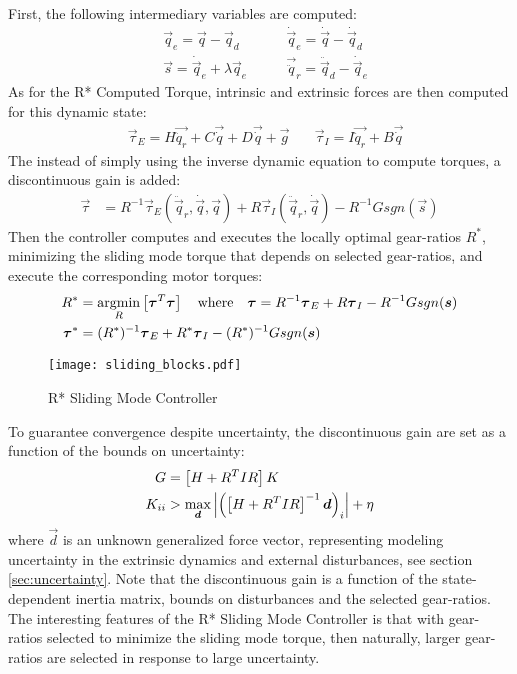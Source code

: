 First, the following intermediary variables are computed:
%
\begin{align}
	&\vec{q}_e        = \vec{q}          -  \vec{q}_d   \quad\quad
	&\dot{\vec{q}}_e  = \dot{\vec{q}}    -  \dot{\vec{q}}_d \\
	&\vec{s}          = \dot{\vec{q}}_e  +  \lambda \vec{q}_e \quad\quad
  &\vec{\ddot{q}}_r = \ddot{\vec{q}}_d -  \dot{\vec{q}}_e 
 \label{eq:slidingvar}
\end{align}
%
As for the R* Computed Torque, intrinsic and extrinsic forces are then computed for this dynamic state:
%
\begin{align}
	&\vec{\tau}_{E} = H \vec{ \ddot{q}_r } + C\vec{ \dot{q} } + D \vec{ \dot{q} } + \vec{ g } \quad
	&\vec{\tau}_{I} = I \vec{ \ddot{q}_r } + B \vec{ \dot{q} } 
\end{align}
%
The instead of simply using the inverse dynamic equation to compute torques, a discontinuous gain is added:
%
\begin{align}
	\vec{\tau} &=  R^{-1} 
	\vec{\tau}_{E}(\ddot{\vec{q}}_r,\dot{\vec{q}},\vec{q}) 
	+ R 
	\vec{\tau}_{I}(\ddot{\vec{q}}_r,\dot{\vec{q}})
  - R^{-1} G sgn( \vec{s} ) 
 \label{eq:slidingctl}
\end{align}
%
Then the controller computes and executes the locally optimal gear-ratios $R^*$, minimizing the sliding mode torque that depends on selected gear-ratios, and execute the corresponding motor torques: 
%
\begin{align}
R^{*} &= \operatornamewithlimits{argmin}\limits_{R} \left[ \vec{\tau}^T\vec{\tau}  \right] \quad\text{where}\quad \vec{\tau} = R^{-1} \vec{\tau}_{E} + R \vec{\tau}_{I} - R^{-1} G sgn( \vec{s} ) 
\\
\vec{\tau}^* &= (R^*)^{-1} \vec{\tau}_{E} + R^* \vec{\tau}_{I} - (R^*)^{-1} G sgn( \vec{s} ) 
\end{align} 
%
\begin{figure}[t]
	\centering
		\texttt{[image: sliding\_blocks.pdf]}
	\caption{R* Sliding Mode Controller}
	\label{fig:sliding_blocks}
\end{figure}
%
To guarantee convergence despite uncertainty, the discontinuous gain are set as a function of the bounds on uncertainty:
%
\begin{align}
	G &= \left[ H + R^T I R \right] K \\ K_{ii} &> \operatornamewithlimits{max}\limits_{\vec{d}} \left| \left(  \left[ H + R^T I R \right]^{-1} \vec{d} \right)_{i} \right| + \eta
\end{align}
%
where $\vec{d}$ is an unknown generalized force vector, representing modeling uncertainty in the extrinsic dynamics and external disturbances, see section \ref{sec:uncertainty}. Note that the discontinuous gain is a function of the state-dependent inertia matrix, bounds on disturbances and the selected gear-ratios. The interesting features of the R* Sliding Mode Controller is that with gear-ratios selected to minimize the sliding mode torque, then naturally, larger gear-ratios are selected in response to large uncertainty. 

